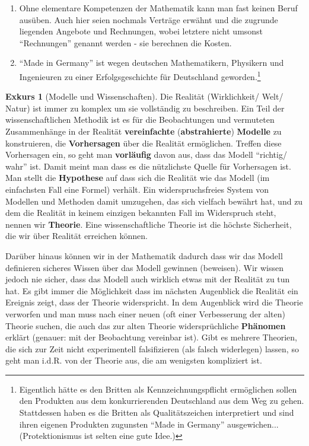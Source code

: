 \documentclass[a4paper]{book}%
\theoremstyle{definition}
\newtheorem{exkurs}{Exkurs}
\begin{document}
\begin{enumerate}
    \item Ohne elementare Kompetenzen der Mathematik kann man fast keinen Beruf ausüben. Auch hier seien nochmals Verträge erwähnt und die zugrunde liegenden Angebote und Rechnungen, wobei letztere nicht umsonst \enquote{Rechnungen} genannt werden - sie berechnen die Kosten.
    \item \enquote{Made in Germany} ist wegen deutschen Mathematikern, Physikern und Ingenieuren zu einer Erfolgsgeschichte für Deutschland geworden.\footnote{Eigentlich hätte es den Britten als Kennzeichnungspflicht ermöglichen sollen den Produkten aus dem konkurrierenden Deutschland aus dem Weg zu gehen. Stattdessen haben es die Britten als Qualitätszeichen interpretiert und sind ihren eigenen Produkten zugunsten \enquote{Made in Germany} ausgewichen... (Protektionismus ist selten eine gute Idee.)}
\end{enumerate}


\begin{exkurs}[Modelle und Wissenschaften]\label{ModelleUndWissenschaften}
    Die Realität (Wirklichkeit/ Welt/ Natur) ist immer zu komplex um sie vollständig zu beschreiben. Ein Teil der wissenschaftlichen Methodik ist es für die Beobachtungen und vermuteten Zusammenhänge in der Realität \textbf{vereinfachte} (\textbf{abstrahierte}) \textbf{Modelle} zu konstruieren, die \textbf{Vorhersagen} über die Realität ermöglichen. Treffen diese Vorhersagen ein, so geht man \textbf{vorläufig} davon aus, dass das Modell \enquote{richtig/ wahr} ist. Damit meint man dass es die nützlichste Quelle für Vorhersagen ist. Man stellt die \textbf{Hypothese} auf dass sich die Realität wie das Modell (im einfachsten Fall eine Formel) verhält. Ein widerspruchsfreies System von Modellen und Methoden damit umzugehen, das sich vielfach bewährt hat, und zu dem die Realität in keinem einzigen bekannten Fall im Widerspruch steht, nennen wir \textbf{Theorie}. Eine wissenschaftliche Theorie ist die höchste Sicherheit, die wir über Realität erreichen können.

    Darüber hinaus können wir in der Mathematik dadurch dass wir das Modell definieren sicheres Wissen über das Modell gewinnen (beweisen). Wir wissen jedoch nie sicher, dass das Modell auch wirklich etwas mit der Realität zu tun hat. Es gibt immer die Möglichkeit dass im nächsten Augenblick die Realität ein Ereignis zeigt, dass der Theorie widerspricht. In dem Augenblick wird die Theorie verworfen und man muss nach einer neuen (oft einer Verbesserung der alten) Theorie suchen, die auch das zur alten Theorie widersprüchliche \textbf{Phänomen} erklärt (genauer: mit der Beobachtung vereinbar ist). Gibt es mehrere Theorien, die sich zur Zeit nicht experimentell falsifizieren (als falsch widerlegen) lassen, so geht man i.d.R. von der Theorie aus, die am wenigsten kompliziert ist.
\end{exkurs}
\end{document}
